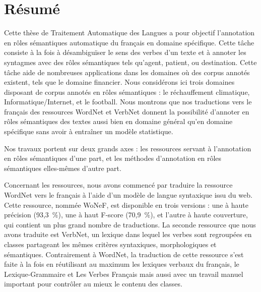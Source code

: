 \documentclass[oneside,parskip,draft]{scrbook}
\date{\Large
    \begin{minipage}[t]{0.61\linewidth}
    \begin{center}\textbf{Thèse sous la direction de :}\end{center}
    Laurence \textsc{Danlos} et Gaël \textsc{de Chalendar}
    \begin{center}~\end{center}
    \begin{center}~\end{center}
    \end{minipage}
}
\title{}
\begin{document}
\maketitle

\frontmatter



\chapter{Résumé}

Cette thèse de Traitement Automatique des Langues a pour objectif l'annotation
en rôles sémantiques automatique du français en domaine spécifique. Cette tâche
consiste à la fois à désambiguïser le sens des verbes d'un texte et à annoter
les syntagmes avec des rôles sémantiques tels qu'agent, patient, ou
destination. Cette tâche aide de nombreuses applications dans les domaines où
des corpus annotés existent, tels que le domaine financier. Nous considérons ici
trois domaines disposant de corpus annotés en rôles sémantiques : le
réchauffement climatique, Informatique/Internet, et le football. Nous montrons
que nos traductions vers le français des ressources WordNet et VerbNet donnent
la possibilité d'annoter en rôles sémantiques des textes aussi bien en domaine
général qu'en domaine spécifique sans avoir à entraîner un modèle statistique.

Nos travaux portent sur deux grands axes : les ressources servant à
l'annotation en rôles sémantiques d'une part, et les méthodes d'annotation en
rôles sémantiques elles-mêmes d'autre part.

Concernant les ressources, nous avons commencé par traduire la ressource
WordNet vers le français à l'aide d'un modèle de langue syntaxique issu du web.
Cette ressource, nommée WoNeF, est disponible en trois versions : une à haute
précision (93,3~\%), une à haut F-score (70,9~\%), et l'autre à haute
couverture, qui contient un plus grand nombre de traductions. La seconde
ressource que nous avons traduite est VerbNet, un lexique dans lequel les
verbes sont regroupées en classes partageant les mêmes critères syntaxiques,
morphologiques et sémantiques. Contrairement à WordNet, la traduction de cette
ressource s'est faite à la fois en réutilisant au maximum les lexiques verbaux
du français, le Lexique-Grammaire et Les Verbes Français mais aussi avec un
travail manuel important pour contrôler au mieux le contenu des classes.
\end{document}
